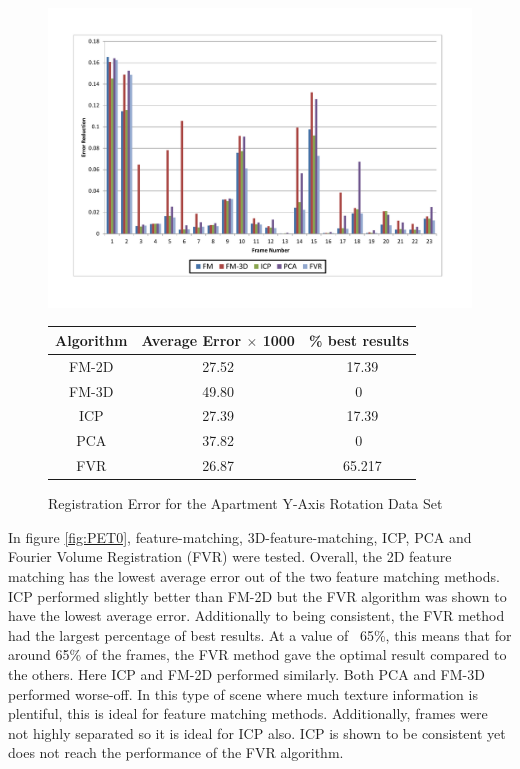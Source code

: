 \begin{figure}
\centering
\includegraphics[width=6in]{images/results/Apartment_Texture_Rotate}
\caption{Registration Error for the Apartment Y-Axis Rotation Data Set}
\label{fig:PET0}

\begin{tabular}{ccc}
\hline
\textbf{Algorithm} & \textbf{Average Error $\times$ 1000} & \textbf{\% best results}\\ \hline
FM-2D	& 27.52 & ~17.39\\
FM-3D	& 49.80 & 0\\
ICP		& 27.39 & ~17.39\\
PCA		& 37.82 & 0\\
FVR		& 26.87 & ~65.217\\
\end{tabular}
\label{tab:PET0ST}
\end{figure} 



In figure \ref{fig:PET0}, feature-matching, 3D-feature-matching, ICP, PCA and Fourier Volume Registration (FVR) were tested. Overall, the 2D feature matching has the lowest average error out of the two feature matching methods. ICP performed slightly better than FM-2D but the FVR algorithm was shown to have the lowest average error. Additionally to being consistent, the FVR method had the largest percentage of best results. At a value of ~65\%, this means that for around 65\% of the frames, the FVR method gave the optimal result compared to the others. Here ICP and FM-2D performed similarly. Both PCA and FM-3D performed worse-off. In this type of scene where much texture information is plentiful, this is ideal for feature matching methods. Additionally, frames were not highly separated so it is ideal for ICP also. ICP is shown to be consistent yet does not reach the performance of the FVR algorithm. \\


